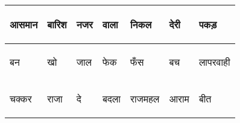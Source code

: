 \documentclass{article}
\begin{document}
\begin{table}[h]
\begin{tabular}{|l|l|l|l|l|l|l|}
\begin{hindi} आसमान \end{hindi} & \begin{hindi} बारिश \end{hindi} & \begin{hindi} नजर \end{hindi} & \begin{hindi} वाला \end{hindi} & \begin{hindi} निकल \end{hindi} & \begin{hindi} देरी \end{hindi} & \begin{hindi} पकड़ \end{hindi} \\ \hline 
\begin{hindi} बन \end{hindi} & \begin{hindi} खो \end{hindi} & \begin{hindi} जाल \end{hindi} & \begin{hindi} फेक \end{hindi} & \begin{hindi} फँस \end{hindi} & \begin{hindi} बच \end{hindi} & \begin{hindi} लापरवाही \end{hindi} \\ \hline 
\begin{hindi} चक्कर \end{hindi} & \begin{hindi} राजा \end{hindi} & \begin{hindi} दे \end{hindi} & \begin{hindi} बदला \end{hindi} & \begin{hindi} राजमहल \end{hindi} & \begin{hindi} आराम \end{hindi} & \begin{hindi} बीत \end{hindi} \\ \hline 

\end{tabular}
\end{table}
\end{document}
